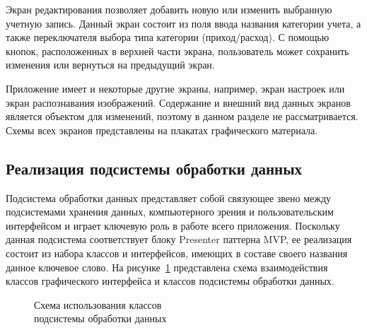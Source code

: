 Экран редактирования позволяет добавить новую или изменить выбранную
учетную запись. Данный экран состоит из поля ввода названия категории учета,
а также переключателя выбора типа категории (приход/расход).
С помощью кнопок, расположенных в верхней части экрана, пользователь
может сохранить изменения или вернуться на предыдущий экран.

Приложение имеет и некоторые другие экраны, например,
экран настроек или экран распознавания изображений.
Содержание и внешний вид данных экранов является объектом для
изменений, поэтому в данном разделе не рассматривается.
Схемы всех экранов представлены на плакатах графического материала.


\subsection{Реализация подсистемы обработки данных}
\label{subsec:implementation_bl}

Подсистема обработки данных представляет собой связующее звено
между подсистемами хранения данных, компьютерного зрения и
пользовательским интерфейсом и играет ключевую роль в работе всего приложения.
Поскольку данная подсистема соответствует блоку Presenter паттерна
MVP, ее реализация состоит из набора классов и интерфейсов,
имеющих в составе своего названия данное ключевое слово.
На рисунке~\ref{fig:implementation_bl_presenter} представлена схема взаимодействия
классов графического интерфейса и классов подсистемы обработки данных.

\begin{figure}[h!]
  \centering
  \caption{Схема использования классов \\ подсистемы обработки данных}
  \label{fig:implementation_bl_presenter}
\end{figure}

